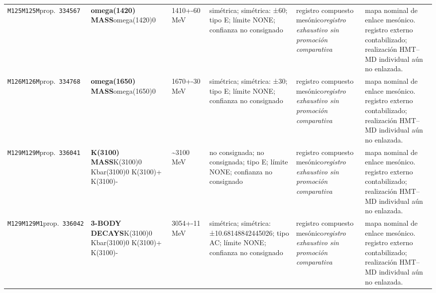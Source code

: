 \begin{landscape}
\begin{longtable}{L{1.85cm}L{4.45cm}L{2.35cm}L{4.05cm}L{3.35cm}L{7.15cm}}
\texttt{M125}\newline \texttt{M125M}\newline prop.\ \texttt{334567} & \textbf{omega(1420) MASS}\newline omega(1420)0 & 1410+-60\,MeV & simétrica; simétrica: ±60; tipo E; límite NONE; confianza no consignado & registro compuesto mesónico\newline \emph{registro exhaustivo sin promoción comparativa} & mapa nominal de enlace mesónico. registro externo contabilizado; realización HMT--MD individual aún no enlazada. \\
\texttt{M126}\newline \texttt{M126M}\newline prop.\ \texttt{334768} & \textbf{omega(1650) MASS}\newline omega(1650)0 & 1670+-30\,MeV & simétrica; simétrica: ±30; tipo E; límite NONE; confianza no consignado & registro compuesto mesónico\newline \emph{registro exhaustivo sin promoción comparativa} & mapa nominal de enlace mesónico. registro externo contabilizado; realización HMT--MD individual aún no enlazada. \\
\texttt{M129}\newline \texttt{M129M}\newline prop.\ \texttt{336041} & \textbf{K(3100) MASS}\newline K(3100)0 \textbar{}\allowbreak{} Kbar(3100)0 \textbar{}\allowbreak{} K(3100)+ \textbar{}\allowbreak{} K(3100)- & \textasciitilde{}3100\,MeV & no consignada; no consignada; tipo E; límite NONE; confianza no consignado & registro compuesto mesónico\newline \emph{registro exhaustivo sin promoción comparativa} & mapa nominal de enlace mesónico. registro externo contabilizado; realización HMT--MD individual aún no enlazada. \\
\texttt{M129}\newline \texttt{M129M1}\newline prop.\ \texttt{336042} & \textbf{3-BODY DECAYS}\newline K(3100)0 \textbar{}\allowbreak{} Kbar(3100)0 \textbar{}\allowbreak{} K(3100)+ \textbar{}\allowbreak{} K(3100)- & 3054+-11\,MeV & simétrica; simétrica: ±10.68148842445026; tipo AC; límite NONE; confianza no consignado & registro compuesto mesónico\newline \emph{registro exhaustivo sin promoción comparativa} & mapa nominal de enlace mesónico. registro externo contabilizado; realización HMT--MD individual aún no enlazada. \\

\end{longtable}
\end{landscape}
